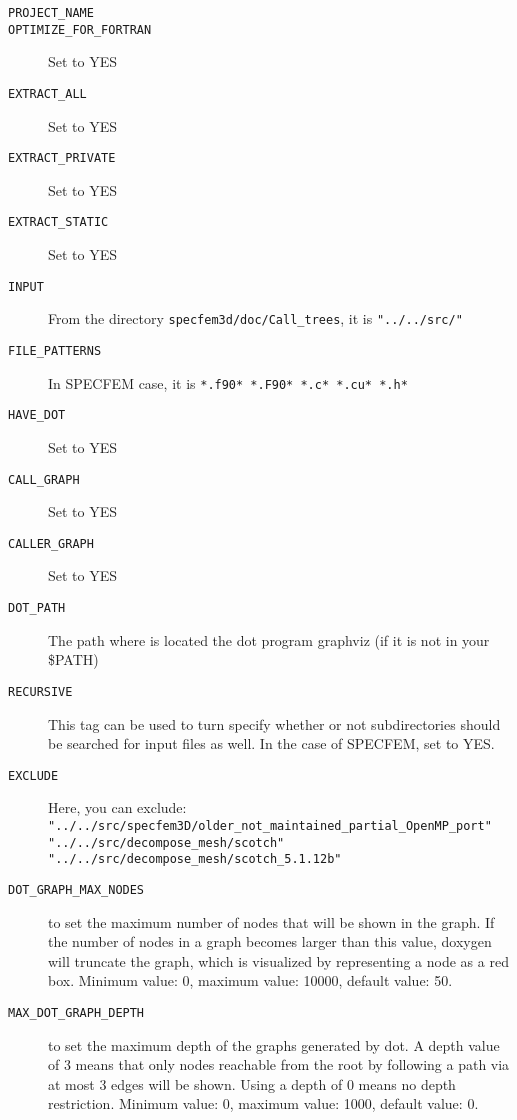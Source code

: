 \begin{enumerate}
\begin{description}
\item [{\texttt{PROJECT\_NAME}}]
\item [{\texttt{OPTIMIZE\_FOR\_FORTRAN}}] Set to YES
\item [{\texttt{EXTRACT\_ALL}}] Set to YES
\item [{\texttt{EXTRACT\_PRIVATE}}] Set to YES
\item [{\texttt{EXTRACT\_STATIC}}] Set to YES
\item [{\texttt{INPUT}}] From the directory \texttt{specfem3d/doc/Call\_trees}, it is \texttt{"../../src/"}
\item [{\texttt{FILE\_PATTERNS}}] In SPECFEM case, it is \texttt{*.f90* *.F90* *.c* *.cu* *.h*}
\item [{\texttt{HAVE\_DOT}}] Set to YES
\item [{\texttt{CALL\_GRAPH}}] Set to YES
\item [{\texttt{CALLER\_GRAPH}}] Set to YES
\item [{\texttt{DOT\_PATH}}] The path where is located the dot program graphviz (if it is not in your \$PATH)
\item [{\texttt{RECURSIVE}}] This tag can be used to turn specify whether or not subdirectories should be searched for input files as well. In the case of SPECFEM, set to YES.
\item [{\texttt{EXCLUDE}}] Here, you can exclude:  \\
\texttt{"../../src/specfem3D/older\_not\_maintained\_partial\_OpenMP\_port"}\\
\texttt{"../../src/decompose\_mesh/scotch"}\\
\texttt{"../../src/decompose\_mesh/scotch\_5.1.12b"}
\item [{\texttt{DOT\_GRAPH\_MAX\_NODES}}] to set the maximum number of nodes that will be shown in the graph. If the number of nodes in a graph becomes larger than this value, doxygen will truncate the graph, which is visualized by representing a node as a red box. Minimum value: 0, maximum value: 10000, default value: 50.
\item [{\texttt{MAX\_DOT\_GRAPH\_DEPTH}}] to set the maximum depth of the graphs generated by dot. A depth value of 3 means that only nodes reachable from the root by following a path via at most 3 edges will be shown. Using a depth of 0 means no depth restriction. Minimum value: 0, maximum value: 1000, default value: 0.

\end{description}


\end{enumerate}
